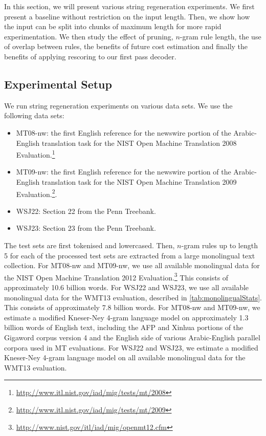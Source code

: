 In this section, we will present various
string regeneration experiments.  We first present
a baseline without restriction on the input length.
Then, we show how
the input can be split into chunks of maximum length for more rapid experimentation. %
We then study the effect of pruning, $n$-gram rule
length, the use of overlap between rules, the benefits of future cost
estimation and finally
the benefits of applying rescoring to our first
pass decoder.

\subsection{Experimental Setup}

We run string regeneration experiments on various
data sets. We use the following data sets:
%
\begin{itemize}
  \item MT08-nw: the first English reference for the newswire portion of the
    Arabic-English translation task for the NIST Open Machine Translation 2008
    Evaluation.\footnote{\url{http://www.itl.nist.gov/iad/mig/tests/mt/2008}}
  \item MT09-nw: the first English reference for the newswire portion of the
    Arabic-English translation task for the NIST Open Machine Translation 2009
    Evaluation.\footnote{\url{http://www.itl.nist.gov/iad/mig/tests/mt/2009}}.
  \item WSJ22: Section 22 from the Penn Treebank.
  \item WSJ23: Section 23 from the Penn Treebank.
\end{itemize}
%
The test sets are first tokenised and lowercased.
Then, $n$-gram rules up to length 5 for each of the processed test sets
are extracted from a large monolingual text collection.
For MT08-nw and MT09-nw, we use all available monolingual data
for the NIST Open Machine Translation 2012
Evaluation.\footnote{\url{http://www.nist.gov/itl/iad/mig/openmt12.cfm}}
This consists of approximately 10.6 billion words.
For WSJ22 and WSJ23, we use all available monolingual data for the WMT13
evaluation, described in \autoref{tab:monolingualStats}.
This consists of approximately 7.8 billion words.
For MT08-nw and MT09-nw, we estimate a modified Kneser-Ney 4-gram language model
on approximately 1.3 billion words of English text, including
the AFP and Xinhua portions of the Gigaword corpus
version 4 and the English side of various Arabic-English
parallel corpora used in MT evaluations. For WSJ22 and WSJ23, we
estimate a modified Kneser-Ney 4-gram language model on all available
monolingual data for the WMT13 evaluation.

